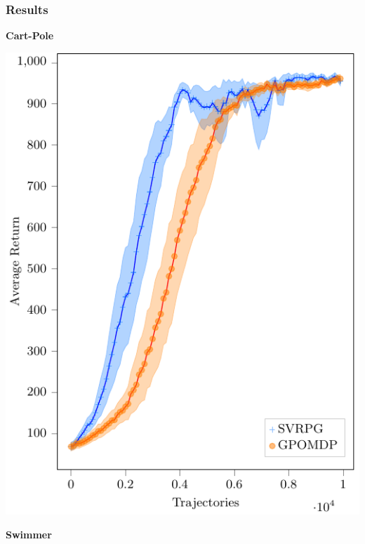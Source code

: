 \documentclass[aspectratio=169]{beamer}
\begin{document}
\begin{frame} 
\frametitle{Results} 


\begin{minipage}[t]{.28\paperwidth}
\begin{center}
	\textbf{Cart-Pole}
\end{center}
\includegraphics[width=\textwidth]{images/cartpole.pdf}
\end{minipage}
%
\begin{minipage}[t]{.28\paperwidth}
\begin{center}
	\textbf{Swimmer}
\end{center}

\end{minipage}
\end{frame}
\end{document}
